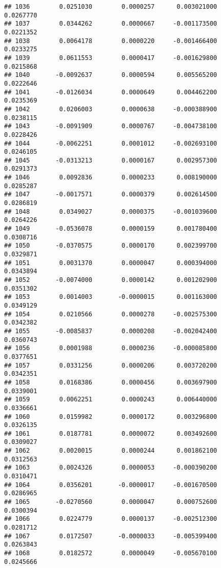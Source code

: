 \documentclass[
]{article}
\begin{document}
\begin{verbatim}
## 1036        0.0251030        0.0000257      0.003021000             0.0267770
## 1037        0.0344262        0.0000667     -0.001173500             0.0221352
## 1038        0.0064178        0.0000220     -0.001466400             0.0233275
## 1039        0.0611553        0.0000417     -0.001629800             0.0215868
## 1040       -0.0092637        0.0000594      0.005565200             0.0222646
## 1041       -0.0126034        0.0000649      0.004462200             0.0235369
## 1042        0.0206003        0.0000638     -0.000388900             0.0238115
## 1043       -0.0091909        0.0000767     -0.004738100             0.0228426
## 1044       -0.0062251        0.0001012     -0.002693100             0.0246105
## 1045       -0.0313213        0.0000167      0.002957300             0.0291373
## 1046        0.0092836        0.0000233      0.008190000             0.0285287
## 1047       -0.0017571        0.0000379      0.002614500             0.0286819
## 1048        0.0349027        0.0000375     -0.001039600             0.0264226
## 1049       -0.0536078        0.0000159      0.001780400             0.0308716
## 1050       -0.0370575        0.0000170      0.002399700             0.0329871
## 1051        0.0031370        0.0000047      0.000394000             0.0343894
## 1052       -0.0074000        0.0000142      0.001202900             0.0351302
## 1053        0.0014003       -0.0000015      0.001163000             0.0349129
## 1054        0.0210566        0.0000278     -0.002575300             0.0342382
## 1055       -0.0085837        0.0000208     -0.002042400             0.0360743
## 1056        0.0001988        0.0000236     -0.000085800             0.0377651
## 1057        0.0331256        0.0000206      0.003720200             0.0342351
## 1058        0.0168386        0.0000456      0.003697900             0.0339001
## 1059        0.0062251        0.0000243      0.006440000             0.0336661
## 1060        0.0159982        0.0000172      0.003296800             0.0326135
## 1061        0.0187781        0.0000072      0.003492600             0.0309027
## 1062        0.0020015        0.0000244      0.001862100             0.0312563
## 1063        0.0024326        0.0000053     -0.000390200             0.0310471
## 1064        0.0356201       -0.0000017     -0.001670500             0.0286965
## 1065       -0.0270560        0.0000047      0.000752600             0.0300394
## 1066        0.0224779        0.0000137     -0.002512300             0.0281712
## 1067        0.0172507       -0.0000033     -0.005399400             0.0263843
## 1068        0.0182572        0.0000049     -0.005670100             0.0245666

\end{verbatim}
\end{document}
